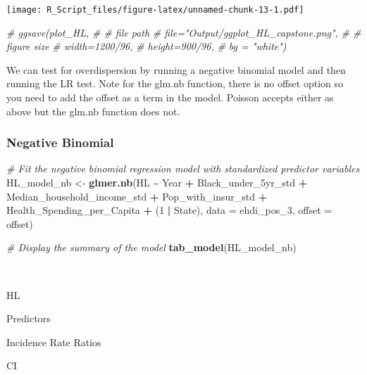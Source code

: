 \documentclass[
]{article}
\newenvironment{Shaded}{\begin{snugshade}}{\end{snugshade}}
\newcommand{\AttributeTok}[1]{\textcolor[rgb]{0.13,0.29,0.53}{#1}}
\newcommand{\CommentTok}[1]{\textcolor[rgb]{0.56,0.35,0.01}{\textit{#1}}}
\newcommand{\DecValTok}[1]{\textcolor[rgb]{0.00,0.00,0.81}{#1}}
\newcommand{\FunctionTok}[1]{\textcolor[rgb]{0.13,0.29,0.53}{\textbf{#1}}}
\newcommand{\NormalTok}[1]{#1}
\newcommand{\OtherTok}[1]{\textcolor[rgb]{0.56,0.35,0.01}{#1}}
\newcommand{\SpecialCharTok}[1]{\textcolor[rgb]{0.81,0.36,0.00}{\textbf{#1}}}
\begin{document}
\texttt{[image: R\_Script\_files/figure-latex/unnamed-chunk-13-1.pdf]}

\begin{Shaded}
\begin{Highlighting}[]
\CommentTok{\# ggsave(plot\_HL,}
\CommentTok{\#        \# file path}
\CommentTok{\#        file="Output/ggplot\_HL\_capstone.png",}
\CommentTok{\#        \# figure size}
\CommentTok{\#        width=1200/96,}
\CommentTok{\#        height=900/96,}
\CommentTok{\#        bg = "white")}
\end{Highlighting}
\end{Shaded}

We can test for overdispersion by running a negative binomial model and
then running the LR test. Note for the glm.nb function, there is no
offset option so you need to add the offset as a term in the model.
Poisson accepts either as above but the glm.nb function does not.

\hypertarget{negative-binomial}{%
\subsubsection{Negative Binomial}\label{negative-binomial}}

\begin{Shaded}
\begin{Highlighting}[]
\CommentTok{\# Fit the negative binomial regression model with standardized predictor variables}
\NormalTok{HL\_model\_nb }\OtherTok{\textless{}{-}} \FunctionTok{glmer.nb}\NormalTok{(HL }\SpecialCharTok{\textasciitilde{}}\NormalTok{ Year }\SpecialCharTok{+}\NormalTok{ Black\_under\_5yr\_std }\SpecialCharTok{+}\NormalTok{ Median\_household\_income\_std }\SpecialCharTok{+} 
\NormalTok{                          Pop\_with\_insur\_std }\SpecialCharTok{+}\NormalTok{ Health\_Spending\_per\_Capita }\SpecialCharTok{+}\NormalTok{  (}\DecValTok{1} \SpecialCharTok{|}\NormalTok{ State), }
                        \AttributeTok{data =}\NormalTok{ ehdi\_pos\_3, }\AttributeTok{offset =}\NormalTok{ offset)}

\CommentTok{\# Display the summary of the model}
\FunctionTok{tab\_model}\NormalTok{(HL\_model\_nb)}
\end{Highlighting}
\end{Shaded}

~

HL

Predictors

Incidence Rate Ratios

CI
\end{document}
